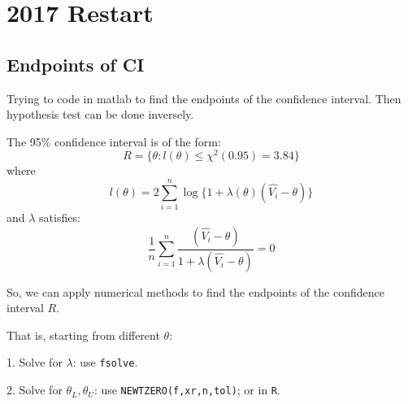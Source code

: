 \documentclass[12pt, oneside]{article}   	%
\begin{document}
\section{2017 Restart}

\subsection{Endpoints of CI}

Trying to code in matlab to find the endpoints of the confidence interval. Then hypothesis test can be done inversely.

The 95\% confidence interval is of the form:
\[
R = \{\theta: l(\theta) \leq \chi^2(0.95) = 3.84 \}
\]
where
\[
l(\theta) = 2\sum_{i=1}^{n} \log\{1 + \lambda (\theta) (\hat{V_i} - \theta)\}
\]
and $\lambda$ satisfies:
\[
\frac{1}{n}\sum_{i=1}^n \frac{(\hat{V_i} - \theta)}{1 + \lambda (\hat{V_i} - \theta)} = 0
\]

So, we can apply numerical methods to find the endpoints of the confidence interval $R$.

That is, starting from different $\theta$:

1. Solve for $\lambda$: use \texttt{fsolve}.

2. Solve for $\theta_L, \theta_U$: use \texttt{NEWTZERO(f,xr,n,tol)}; or in \texttt{R}.
\end{document}
